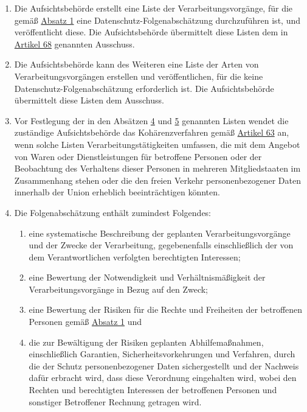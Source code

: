 \begin{enumerate}
\begin{enumerate}
  \end{enumerate}

  \item Die Aufsichtsbehörde erstellt eine Liste der Verarbeitungsvorgänge, für die gemäß \hyperref[itm:35-1]{Absatz 1}
   eine Datenschutz-Folgenabschätzung durchzuführen ist, und veröffentlicht diese. Die Aufsichtsbehörde übermittelt
   diese Listen dem in \hyperref[ch:68]{Artikel 68} genannten Ausschuss.
  \label{itm:35-4}

  \item Die Aufsichtsbehörde kann des Weiteren eine Liste der Arten von Verarbeitungsvorgängen erstellen und
   veröffentlichen, für die keine Datenschutz-Folgenabschätzung erforderlich ist. Die Aufsichtsbehörde übermittelt
   diese Listen dem Ausschuss.
  \label{itm:35-5}

  \item Vor Festlegung der in den Absätzen \hyperref[itm:35-4]{4} und \hyperref[itm:35-5]{5} genannten Listen wendet die
   zuständige Aufsichtsbehörde das Kohärenzverfahren gemäß \hyperref[ch:63]{Artikel 63} an, wenn solche Listen
   Verarbeitungstätigkeiten umfassen, die mit dem Angebot von Waren oder Dienstleistungen für betroffene Personen oder
   der Beobachtung des Verhaltens dieser Personen in mehreren Mitgliedstaaten im Zusammenhang stehen oder die den
   freien Verkehr personenbezogener Daten innerhalb der Union erheblich beeinträchtigen könnten.
  \label{itm:35-6}

  \item Die Folgenabschätzung enthält zumindest Folgendes:
  \label{itm:35-7}

  \begin{enumerate}
  
    \item eine systematische Beschreibung der geplanten Verarbeitungsvorgänge und der Zwecke der Verarbeitung,
     gegebenenfalls einschließlich der von dem Verantwortlichen verfolgten berechtigten Interessen;
    \label{itm:35-7a}

    \item eine Bewertung der Notwendigkeit und Verhältnismäßigkeit der Verarbeitungsvorgänge in Bezug auf den Zweck;
    \label{itm:35-7b}

    \item eine Bewertung der Risiken für die Rechte und Freiheiten der betroffenen Personen gemäß \hyperref[itm:35-1]
     {Absatz 1} und
    \label{itm:35-7c}

    \item die zur Bewältigung der Risiken geplanten Abhilfemaßnahmen, einschließlich Garantien, Sicherheitsvorkehrungen
     und Verfahren, durch die der Schutz personenbezogener Daten sichergestellt und der Nachweis dafür erbracht wird,
     dass diese Verordnung eingehalten wird, wobei den Rechten und berechtigten Interessen der betroffenen Personen und
     sonstiger Betroffener Rechnung getragen wird.
    \label{itm:35-7d}


\end{enumerate}
\end{enumerate}
